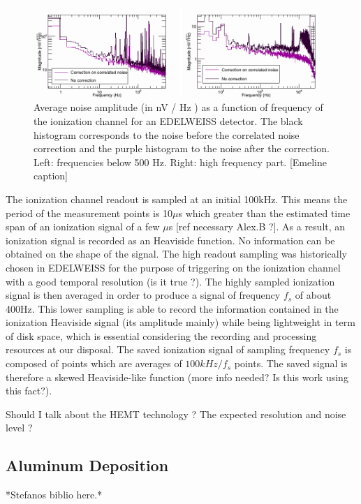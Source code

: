 \begin{figure}
\centering
\includegraphics[width=\textwidth]{Figures/Electrodes/ionization_noise.pdf}
\caption{Average noise amplitude (in nV / Hz ) as a function of frequency of the
ionization channel for an EDELWEISS detector. The black histogram corresponds to the
noise before the correlated noise correction and the purple histogram to the noise after
the correction. Left: frequencies below 500 Hz. Right: high frequency part. [Emeline caption]}
\label{fig:ionization-noise}
\end{figure}

The ionization channel readout is sampled at an initial 100kHz. This means the period of the  measurement points is 10$\mu$s which greater than the estimated time span of an ionization signal of a few $\mu$s [ref necessary Alex.B ?]. As a result, an ionization signal is recorded as an Heaviside function. No information can be obtained on the shape of the signal.
The high readout sampling was historically chosen in EDELWEISS for the purpose of triggering on the ionization channel with a good temporal resolution (is it true ?). The highly sampled ionization signal is then averaged in order to produce a signal of frequency $f_s$ of about 400Hz. This lower sampling is able to record the information contained in the ionization Heaviside signal (its amplitude mainly) while being lightweight in term of disk space, which is essential considering the recording and processing resources at our disposal. The saved ionization signal of sampling frequency $f_s$ is composed of points which are averages of $100kHz/f_s$ points. The saved signal is therefore a skewed Heaviside-like function (more info needed? Is this work using this fact?).

Should I talk about the HEMT technology ? The expected resolution and noise level ?


\subsection{Aluminum Deposition}

*Stefanos biblio here.*


